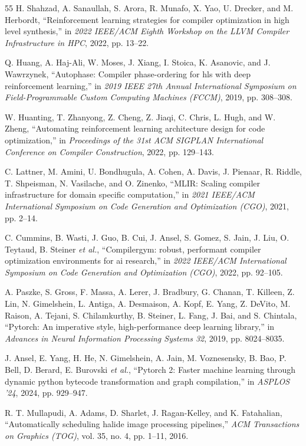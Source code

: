 \documentclass[10pt,twocolumn]{article}
\begin{document}
\begin{thebibliography}{55}
 H. Shahzad, A. Sanaullah, S. Arora, R. Munafo, X. Yao, U. Drecker, and M. Herbordt, ``Reinforcement learning strategies for compiler optimization in high level synthesis,'' in \emph{2022 IEEE/ACM Eighth Workshop on the LLVM Compiler Infrastructure in HPC}, 2022, pp. 13--22.

 Q. Huang, A. Haj-Ali, W. Moses, J. Xiang, I. Stoica, K. Asanovic, and J. Wawrzynek, ``Autophase: Compiler phase-ordering for hls with deep reinforcement learning,'' in \emph{2019 IEEE 27th Annual International Symposium on Field-Programmable Custom Computing Machines (FCCM)}, 2019, pp. 308--308.

 W. Huanting, T. Zhanyong, Z. Cheng, Z. Jiaqi, C. Chris, L. Hugh, and W. Zheng, ``Automating reinforcement learning architecture design for code optimization,'' in \emph{Proceedings of the 31st ACM SIGPLAN International Conference on Compiler Construction}, 2022, pp. 129--143.

 C. Lattner, M. Amini, U. Bondhugula, A. Cohen, A. Davis, J. Pienaar, R. Riddle, T. Shpeisman, N. Vasilache, and O. Zinenko, ``MLIR: Scaling compiler infrastructure for domain specific computation,'' in \emph{2021 IEEE/ACM International Symposium on Code Generation and Optimization (CGO)}, 2021, pp. 2--14.

 C. Cummins, B. Wasti, J. Guo, B. Cui, J. Ansel, S. Gomez, S. Jain, J. Liu, O. Teytaud, B. Steiner \emph{et al.}, ``Compilergym: robust, performant compiler optimization environments for ai research,'' in \emph{2022 IEEE/ACM International Symposium on Code Generation and Optimization (CGO)}, 2022, pp. 92--105.

 A. Paszke, S. Gross, F. Massa, A. Lerer, J. Bradbury, G. Chanan, T. Killeen, Z. Lin, N. Gimelshein, L. Antiga, A. Desmaison, A. Kopf, E. Yang, Z. DeVito, M. Raison, A. Tejani, S. Chilamkurthy, B. Steiner, L. Fang, J. Bai, and S. Chintala, ``Pytorch: An imperative style, high-performance deep learning library,'' in \emph{Advances in Neural Information Processing Systems 32}, 2019, pp. 8024--8035.

 J. Ansel, E. Yang, H. He, N. Gimelshein, A. Jain, M. Voznesensky, B. Bao, P. Bell, D. Berard, E. Burovski \emph{et al.}, ``Pytorch 2: Faster machine learning through dynamic python bytecode transformation and graph compilation,'' in \emph{ASPLOS '24}, 2024, pp. 929--947.

 R. T. Mullapudi, A. Adams, D. Sharlet, J. Ragan-Kelley, and K. Fatahalian, ``Automatically scheduling halide image processing pipelines,'' \emph{ACM Transactions on Graphics (TOG)}, vol. 35, no. 4, pp. 1--11, 2016.


\end{thebibliography}
\end{document}
